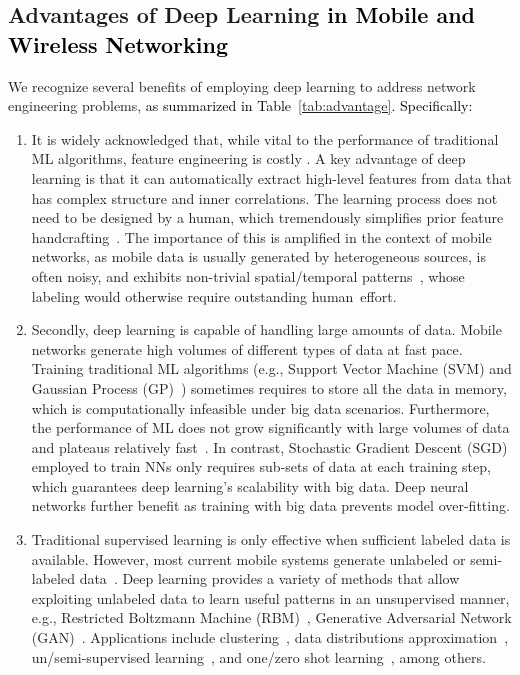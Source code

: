 \documentclass[journal,comsoc,letter]{IEEEtran}
\newcommand{\edit}[1]{\textcolor{black}{#1}}
\newcommand{\rev}[1]{\textcolor{black}{#1}}
\begin{document}
\subsection{Advantages of Deep Learning \rev{in Mobile and Wireless Networking} \label{sec:adv}}
We recognize several benefits of employing deep learning to address network engineering problems, \edit{as summarized in Table~\ref{tab:advantage}. Specifically:}
\begin{enumerate}
\item It is widely acknowledged that, while vital to the performance of traditional ML algorithms, feature engineering is costly \cite{Domingos:2012}. A key advantage of deep learning is that it can automatically extract high-level features from data that has complex structure and inner correlations. The learning process does not need to be designed by a human, which tremendously simplifies prior feature handcrafting~\cite{lecun2015deep}. The importance of this is amplified in the context of mobile networks, as mobile data is usually generated by heterogeneous sources, is often noisy, and exhibits non-trivial spatial/temporal patterns~\cite{alsheikh2016mobile}, whose labeling would otherwise require outstanding \mbox{human effort.} \item Secondly, deep learning is capable of handling large amounts of data. Mobile networks generate high volumes of different types of data at fast pace. Training traditional ML algorithms (e.g., Support Vector Machine (SVM) \cite{tsang2005core} and Gaussian Process (GP)~\cite{rasmussen2006gaussian}) sometimes requires to store all the data in memory, which is computationally infeasible under big data scenarios. Furthermore, the performance of ML does not grow significantly with large volumes of data and plateaus relatively fast~\cite{goodfellow2016deep}. In contrast, Stochastic Gradient Descent (SGD) employed to train NNs only requires sub-sets of data at each training step, which guarantees deep learning's scalability with big data. Deep neural networks further benefit as training with big data prevents model over-fitting.

\item Traditional supervised learning is only effective when sufficient labeled data is available. However, most current mobile systems generate unlabeled or semi-labeled data~\cite{alsheikh2016mobile}. Deep learning provides a variety of methods that allow exploiting unlabeled data to learn useful patterns in an unsupervised manner, e.g., Restricted Boltzmann Machine (RBM)~\cite{le2008representational}, Generative Adversarial Network (GAN)~\cite{goodfellow2014generative}. Applications include clustering~\cite{schroff2015facenet}, data distributions approximation~\cite{goodfellow2014generative}, un/semi-supervised learning~\cite{kingma2014semi, stewart2017label}, and one/zero shot learning~\cite{rezende2016one, socher2013zero}, among others. 


\end{enumerate}
\end{document}

